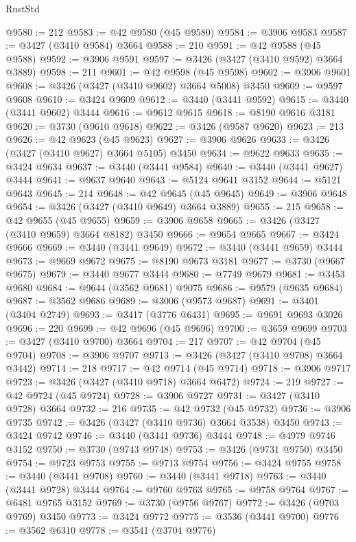 \begin{lexlean}{RustStd}
\begin{coremodule}
@9580 := 212
@9583 := @42 @9580 (@45 @9580)
@9584 := @3906 @9583
@9587 := @3427 (@3410 @9584) @3664
@9588 := 210
@9591 := @42 @9588 (@45 @9588)
@9592 := @3906 @9591
@9597 := @3426 (@3427 (@3410 @9592) @3664 @3889)
@9598 := 211
@9601 := @42 @9598 (@45 @9598)
@9602 := @3906 @9601
@9608 := @3426 (@3427 (@3410 @9602) @3664 @5008) @3450
@9609 := @9597 @9608
@9610 := @3424 @9609
@9612 := @3440 (@3441 @9592)
@9615 := @3440 (@3441 @9602) @3444
@9616 := @9612 @9615
@9618 := @8190 @9616 @3181
@9620 := @3730 (@9610 @9618)
@9622 := @3426 (@9587 @9620)
@9623 := 213
@9626 := @42 @9623 (@45 @9623)
@9627 := @3906 @9626
@9633 := @3426 (@3427 (@3410 @9627) @3664 @5105) @3450
@9634 := @9622 @9633
@9635 := @3424 @9634
@9637 := @3440 (@3441 @9584)
@9640 := @3440 (@3441 @9627) @3444
@9641 := @9637 @9640
@9643 := @5124 @9641 @3152
@9644 := @5121 @9643
@9645 := 214
@9648 := @42 @9645 (@45 @9645)
@9649 := @3906 @9648
@9654 := @3426 (@3427 (@3410 @9649) @3664 @3889)
@9655 := 215
@9658 := @42 @9655 (@45 @9655)
@9659 := @3906 @9658
@9665 := @3426 (@3427 (@3410 @9659) @3664 @8182) @3450
@9666 := @9654 @9665
@9667 := @3424 @9666
@9669 := @3440 (@3441 @9649)
@9672 := @3440 (@3441 @9659) @3444
@9673 := @9669 @9672
@9675 := @8190 @9673 @3181
@9677 := @3730 (@9667 @9675)
@9679 := @3440 @9677 @3444
@9680 := @7749 @9679
@9681 := @3453 @9680
@9684 := @9644 (@3562 @9681) @9075
@9686 := @9579 (@9635 @9684)
@9687 := @3562 @9686
@9689 := @3006 (@9573 @9687)
@9691 := @3401 (@3404 @2749)
@9693 := @3417 (@3776 @6431)
@9695 := @9691 @9693 @3026
@9696 := 220
@9699 := @42 @9696 (@45 @9696)
@9700 := @3659 @9699
@9703 := @3427 (@3410 @9700) @3664
@9704 := 217
@9707 := @42 @9704 (@45 @9704)
@9708 := @3906 @9707
@9713 := @3426 (@3427 (@3410 @9708) @3664 @3442)
@9714 := 218
@9717 := @42 @9714 (@45 @9714)
@9718 := @3906 @9717
@9723 := @3426 (@3427 (@3410 @9718) @3664 @6472)
@9724 := 219
@9727 := @42 @9724 (@45 @9724)
@9728 := @3906 @9727
@9731 := @3427 (@3410 @9728) @3664
@9732 := 216
@9735 := @42 @9732 (@45 @9732)
@9736 := @3906 @9735
@9742 := @3426 (@3427 (@3410 @9736) @3664 @3538) @3450
@9743 := @3424 @9742
@9746 := @3440 (@3441 @9736) @3444
@9748 := @4979 @9746 @3152
@9750 := @3730 (@9743 @9748)
@9753 := @3426 (@9731 @9750) @3450
@9754 := @9723 @9753
@9755 := @9713 @9754
@9756 := @3424 @9755
@9758 := @3440 (@3441 @9708)
@9760 := @3440 (@3441 @9718)
@9763 := @3440 (@3441 @9728) @3444
@9764 := @9760 @9763
@9765 := @9758 @9764
@9767 := @6481 @9765 @3152
@9769 := @3730 (@9756 @9767)
@9772 := @3426 (@9703 @9769) @3450
@9773 := @3424 @9772
@9775 := @3536 (@3441 @9700)
@9776 := @3562 @6310
@9778 := @3541 (@3704 @9776)

\end{coremodule}
\end{lexlean}

